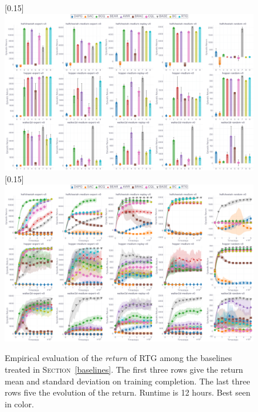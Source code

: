 \begin{figure}
  \center\scalebox{0.15}[0.15]{\includegraphics{Plots/baselines_with_rtg/plots_main_eval_env_ret_barplot.pdf}}
  \center\scalebox{0.15}[0.15]{\includegraphics{Plots/baselines_with_rtg/plots_main_eval_env_ret_plot.pdf}}
  \caption{Empirical evaluation of the \emph{return} of RTG among the baselines
  treated in \textsc{Section}~\ref{baselines}.
  The first three rows give the return mean and standard deviation on training completion.
  The last three rows five the evolution of the return.
  Runtime is 12 hours. Best seen in color.}
  \label{rtgbaselines:barplot}
\end{figure}

